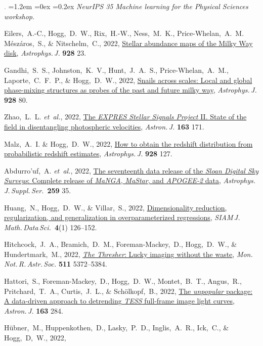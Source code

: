 \documentclass[10pt,letterpaper]{article}
\newcommand{\acronym}[1]{{\small{#1}}}
\newcommand{\foreign}[1]{\textsl{#1}}
\newcommand{\etal}{\foreign{et~al.}}
\newcommand{\project}[1]{\textsl{#1}}
\newcommand{\doi}[2]{\href{http://dx.doi.org/#1}{{#2}}}
\newcommand{\deemph}[1]{\textcolor{grey}{\footnotesize{#1}}}
\newcommand{\pubnumber}[1]{\deemph{{#1}.}}
\newcounter{refpubnum}
\newcommand{\hogglist}{%
    \rightmargin=0in
    \leftmargin=1.2em
    \topsep=0ex
    \partopsep=0pt
    \itemsep=0.2ex
    \parsep=0pt
    \itemindent=-1.0\leftmargin
    \listparindent=0.0\leftmargin
    \settowidth{\labelsep}{~}
    \usecounter{refpubnum}
  }
\begin{document}
\begin{list}{\pubnumber{\therefpubnum}}{\hogglist}
  \textit{NeurIPS 35 Machine learning for the Physical Sciences workshop}.
\item
  Eilers,~A.-C., Hogg,~D.~W., Rix,~H.-W., Ness,~M.~K., Price-Whelan,~A.~M. M\'esz\'aros,~S.,
  \& Nitschelm,~C., 2022,
  \doi{10.3847/1538-4357/ac54ad}{Stellar abundance maps of the Milky Way disk},
  \textit{Astrophys.\,J.} \textbf{928} 23.  
\item
  Gandhi,~S.~S., Johnston,~K.~V., Hunt,~J.~A.~S., Price-Whelan,~A.~M., Laporte,~C.~F.~P.,
  \& Hogg,~D.~W., 2022,
  \doi{10.3847/1538-4357/ac47f7}{Snails across scales: Local and global phase-mixing structures as probes of the past and future milky way},
  \textit{Astrophys.\,J.} \textbf{928} 80.
\item
  Zhao,~L.~L. \etal, 2022,
  \doi{10.3847/1538-3881/ac5176}{The \project{EXPRES Stellar Signals Project} II. State of the field in disentangling photospheric velocities},
  \textit{Astron.\,J.} \textbf{163} 171.  
\item
  Malz,~A.~I. \& Hogg,~D.~W., 2022,
  \doi{10.3847/1538-4357/ac062f}{How to obtain the redshift distribution from probabilistic redshift estimates},
  \textit{Astrophys.\,J.} \textbf{928} 127.
\item
  Abdurro'uf,~A. \etal, 2022,
  \doi{10.3847/1538-4365/ac4414}{The seventeenth data release of the \project{Sloan Digital Sky Surveys}: Complete release of \project{MaNGA}, \project{MaStar}, and \project{APOGEE-2} data},
  \textit{Astrophys.\,J.\,Suppl.\,Ser.}\ \textbf{259} 35.
\item
  Huang,~N., Hogg,~D.~W., \& Villar,~S., 2022,
  \doi{10.1137/20M1387821}{Dimensionality reduction, regularization, and generalization in overparameterized regressions},
  \textit{\acronym{SIAM}\,J.\,Math.\,Data\,Sci.}\ \textbf{4}(1) 126--152.
\item
  Hitchcock,~J.~A., Bramich,~D.~M., Foreman-Mackey,~D., Hogg,~D.~W., \& Hundertmark,~M., 2022,
  \doi{10.1093/mnras/stac427}{\project{The Thresher}: Lucky imaging without the waste},
  \textit{Mon.\,Not.\,R.\,Astr.\,Soc.} \textbf{511} 5372--5384. 
\item
  Hattori,~S., Foreman-Mackey,~D., Hogg,~D.~W., Montet,~B.~T., Angus,~R., Pritchard,~T.~A.,
  Curtis,~J.~L., \& Sch\"olkopf,~B., 2022,
  \doi{10.3847/1538-3881/ac625a}{The \project{unpopular} package: A data-driven approach to detrending \project{TESS} full-frame image light curves},
  \textit{Astron.\,J.} \textbf{163} 284.
\item
  H\"ubner,~M., Huppenkothen,~D., Lasky,~P.~D., Inglis,~A.~R., Ick,~C., \& Hogg,~D,~W., 2022,

\end{list}
\end{document}
